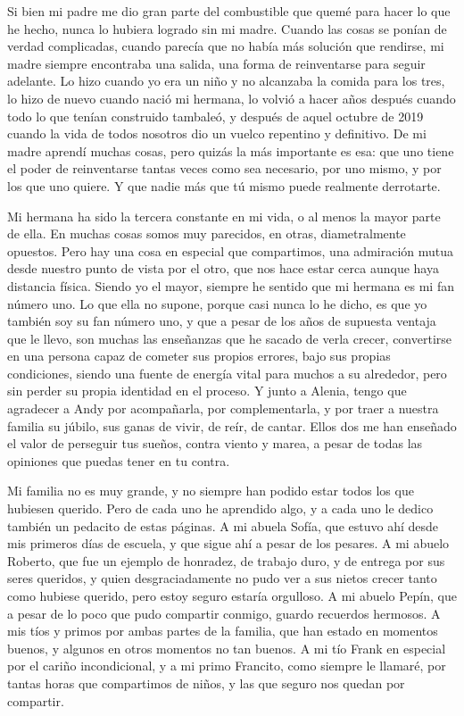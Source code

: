 Si bien mi padre me dio gran parte del combustible que quemé para hacer lo que he hecho, nunca lo hubiera logrado sin mi madre.
Cuando las cosas se ponían de verdad complicadas, cuando parecía que no había más solución que rendirse, mi madre siempre encontraba una salida, una forma de reinventarse para seguir adelante.
Lo hizo cuando yo era un niño y no alcanzaba la comida para los tres, lo hizo de nuevo cuando nació mi hermana, lo volvió a hacer años después cuando todo lo que tenían construido tambaleó, y después de aquel octubre de 2019 cuando la vida de todos nosotros dio un vuelco repentino y definitivo.
De mi madre aprendí muchas cosas, pero quizás la más importante es esa: que uno tiene el poder de reinventarse tantas veces como sea necesario, por uno mismo, y por los que uno quiere.
Y que nadie más que tú mismo puede realmente derrotarte.

Mi hermana ha sido la tercera constante en mi vida, o al menos la mayor parte de ella.
En muchas cosas somos muy parecidos, en otras, diametralmente opuestos.
Pero hay una cosa en especial que compartimos, una admiración mutua desde nuestro punto de vista por el otro, que nos hace estar cerca aunque haya distancia física.
Siendo yo el mayor, siempre he sentido que mi hermana es mi fan número uno.
Lo que ella no supone, porque casi nunca lo he dicho, es que yo también soy su fan número uno, y que a pesar de los años de supuesta ventaja que le llevo, son muchas las enseñanzas que he sacado de verla crecer, convertirse en una persona capaz de cometer sus propios errores, bajo sus propias condiciones, siendo una fuente de energía vital para muchos a su alrededor, pero sin perder su propia identidad en el proceso.
Y junto a Alenia, tengo que agradecer a Andy por acompañarla, por complementarla, y por traer a nuestra familia su júbilo, sus ganas de vivir, de reír, de cantar.
Ellos dos me han enseñado el valor de perseguir tus sueños, contra viento y marea, a pesar de todas las opiniones que puedas tener en tu contra.

Mi familia no es muy grande, y no siempre han podido estar todos los que hubiesen querido. Pero de cada uno he aprendido algo, y a cada uno le dedico también un pedacito de estas páginas.
A mi abuela Sofía, que estuvo ahí desde mis primeros días de escuela, y que sigue ahí a pesar de los pesares.
A mi abuelo Roberto, que fue un ejemplo de honradez, de trabajo duro, y de entrega por sus seres queridos, y quien desgraciadamente no pudo ver a sus nietos crecer tanto como hubiese querido, pero estoy seguro estaría orgulloso.
A mi abuelo Pepín, que a pesar de lo poco que pudo compartir conmigo, guardo recuerdos hermosos. A mis tíos y primos por ambas partes de la familia, que han estado en momentos buenos, y algunos en otros momentos no tan buenos.
A mi tío Frank en especial por el cariño incondicional, y a mi primo Francito, como siempre le llamaré, por tantas horas que compartimos de niños, y las que seguro nos quedan por compartir.

